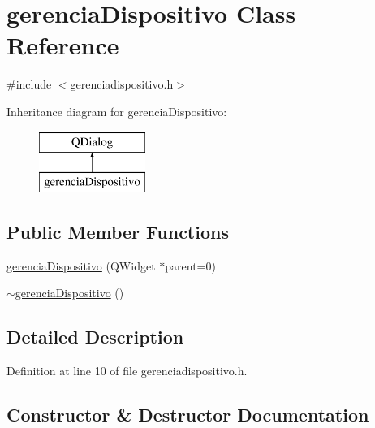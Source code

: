 \hypertarget{classgerencia_dispositivo}{}\section{gerencia\+Dispositivo Class Reference}
\label{classgerencia_dispositivo}


{\ttfamily \#include $<$gerenciadispositivo.\+h$>$}

Inheritance diagram for gerencia\+Dispositivo\+:\begin{figure}[H]
\begin{center}
\leavevmode
\includegraphics[height=2.000000cm]{classgerencia_dispositivo}
\end{center}
\end{figure}
\subsection*{Public Member Functions}
\begin{DoxyCompactItemize}
\item 
\hyperlink{classgerencia_dispositivo_a245e771cf0d5c9e2929e0829d57bf97b}{gerencia\+Dispositivo} (Q\+Widget $\ast$parent=0)
\item 
\hyperlink{classgerencia_dispositivo_a3dcef9c3f95ad6be653920a0952b8a0a}{$\sim$gerencia\+Dispositivo} ()
\end{DoxyCompactItemize}


\subsection{Detailed Description}


Definition at line 10 of file gerenciadispositivo.\+h.



\subsection{Constructor \& Destructor Documentation}
\hypertarget{classgerencia_dispositivo_a245e771cf0d5c9e2929e0829d57bf97b}{}\label{classgerencia_dispositivo_a245e771cf0d5c9e2929e0829d57bf97b} 

